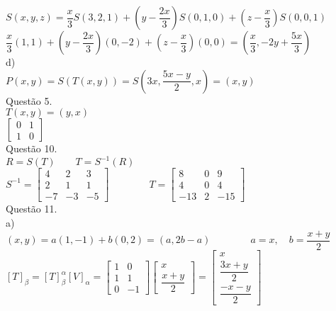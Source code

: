 \documentclass[12pt]{article}
\begin{document}
$S(x,y,z)=\dfrac{x}{3}S(3,2,1)+(y-\dfrac{2x}{3})S(0,1,0)+(z-\dfrac{x}{3})S(0,0,1)$\\

$\dfrac{x}{3}(1,1)+(y-\dfrac{2x}{3})(0,-2)+(z-\dfrac{x}{3})(0,0)=(\dfrac{x}{3},-2y+\dfrac{5x}{3})$\\

\noindent d)\\

$P(x,y)=S(T(x,y))=S(3x,\dfrac{5x-y}{2},x)=(x,y)$\\

\noindent Questão 5.\\

$T(x,y)=(y,x)$\\

$\begin{bmatrix}0&1\\1&0\end{bmatrix}$\\

\noindent Questão 10.\\

$R=S(T)\qquad T=S^{-1}(R)$\\

$S^{-1}=\begin{bmatrix}4&2&3\\2&1&1\\-7&-3&-5\end{bmatrix}\qquad\qquad T=\begin{bmatrix}8&0&9\\4&0&4\\-13&2&-15\end{bmatrix}$\\

\noindent Questão 11.\\

\noindent a)\\

$(x,y)=a(1,-1)+b(0,2)=(a,2b-a)\qquad\qquad a=x,\quad b=\dfrac{x+y}{2}$\\

$[T]_{\beta}=[T]_{\beta}^{\alpha}[V]_{\alpha}=\begin{bmatrix}1&0\\1&1\\0&-1\end{bmatrix}\begin{bmatrix}x\\\dfrac{x+y}{2}\end{bmatrix}=\begin{bmatrix}x\\\dfrac{3x+y}{2}\\\dfrac{-x-y}{2}\end{bmatrix}$\\
\end{document}

